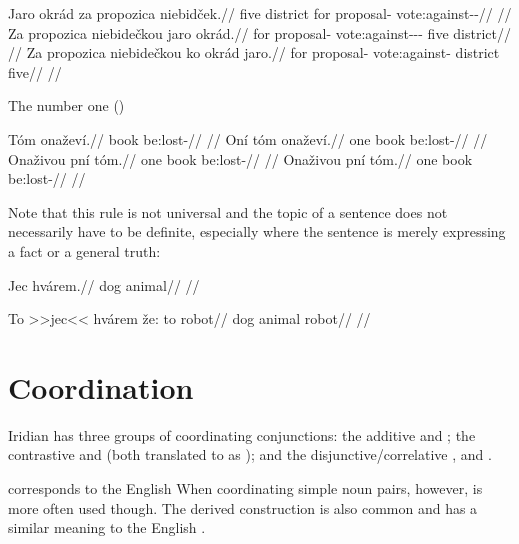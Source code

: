 \pex
\a
\begingl
\gla Jaro okrád za propozica niebidček.//
\glb five district for proposal-\Acc{} vote:against-\Av{}-\Pf{}//
\glft {}//
\endgl
\a
\begingl
\gla Za propozica niebidečkou jaro okrád.//
\glb for proposal-\Acc{} vote:against-\Av{}-\Pf{}-\Nz{} five district//
\glft {}//
\endgl
\a
\begingl
\gla Za propozica niebidečkou ko okrád jaro.//
\glb for proposal-\Acc{} vote:against-  district five//
\glft {}//
\endgl
\xe

The number one ()

\pex
\a
\begingl
\gla Tóm onaževí.//
\glb book be:lost-//
\glft {}//
\endgl
\a
\begingl
\gla Oní tóm onaževí.//
\glb one book be:lost-//
\glft {}//
\endgl
\a
\begingl
\gla Onaživou pní tóm.//
\glb one book be:lost-//
\glft {}//
\endgl
\a
\begingl
\gla Onaživou pní tóm.//
\glb one book be:lost-//
\glft {}//
\endgl
\xe


Note that this rule is not universal and the topic of a sentence does not necessarily have to be definite, especially where the sentence is merely expressing a fact or a general truth:

\pex
\begingl
\gla Jec hvárem.//
\glb dog animal//
\glft {}//
\endgl
\xe



\pex
\begingl
\gla To >>jec<< hvárem že: to robot//
\glb \Dem{} dog animal  \Dem{} robot//
\glft {}//
\endgl
\xe




\section{Coordination} 

Iridian has three groups of coordinating conjunctions: the additive  and ;
the contrastive  and  (both translated to  as ); and the disjunctive/correlative ,  and .

 corresponds to the English  When coordinating simple noun pairs, however,  is more often used though. The derived construction  is also common and has a similar meaning to the English .

